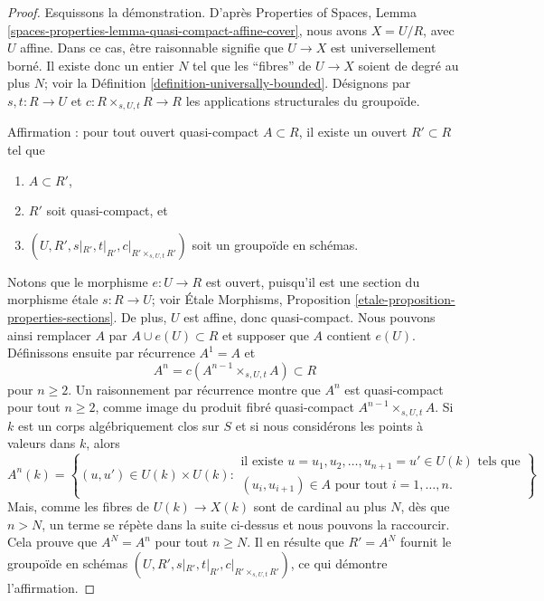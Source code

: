 \begin{proof}
Esquissons la démonstration. D'après
Properties of Spaces, Lemma
\ref{spaces-properties-lemma-quasi-compact-affine-cover},
nous avons $X = U/R$, avec $U$ affine.
Dans ce cas, être raisonnable signifie que $U \to X$ est
universellement borné. Il existe donc un entier $N$ tel que les ``fibres'' de
$U \to X$ soient de degré au plus $N$; voir la
Définition \ref{definition-universally-bounded}.
Désignons par $s, t : R \to U$ et $c : R \times_{s, U, t} R \to R$ les
applications structurales du groupoïde.

\medskip\noindent
Affirmation : pour tout ouvert quasi-compact $A \subset R$, il existe un ouvert
$R' \subset R$ tel que
\begin{enumerate}
\item $A \subset R'$,
\item $R'$ soit quasi-compact, et
\item $(U, R', s|_{R'}, t|_{R'}, c|_{R' \times_{s, U, t} R'})$ soit
un groupoïde en schémas.
\end{enumerate}
Notons que le morphisme $e : U \to R$ est ouvert, puisqu'il est une section du
morphisme étale $s : R \to U$; voir
\'Etale Morphisms, Proposition \ref{etale-proposition-properties-sections}.
De plus, $U$ est affine, donc quasi-compact. Nous pouvons ainsi remplacer $A$
par $A \cup e(U) \subset R$ et supposer que $A$ contient $e(U)$. Définissons
ensuite par récurrence $A^1 = A$ et
$$
A^n = c(A^{n - 1} \times_{s, U, t} A) \subset R
$$
pour $n \geq 2$. Un raisonnement par récurrence montre que $A^n$ est
quasi-compact pour tout $n \geq 2$, comme image du produit fibré quasi-compact
$A^{n - 1} \times_{s, U, t} A$. Si $k$ est un corps algébriquement clos sur
$S$ et si nous considérons les points à valeurs dans $k$, alors
$$
A^n(k) = \left\{(u, u') \in U(k) \times U(k)
:
\begin{matrix}
\text{il existe } u = u_1, u_2, \ldots, u_{n + 1} = u' \in U(k)
\text{ tels que} \\
(u_i , u_{i + 1}) \in A \text{ pour tout }i = 1, \ldots, n.
\end{matrix}
\right\}
$$
Mais, comme les fibres de $U(k) \to X(k)$ sont de cardinal au plus $N$, dès
que $n > N$, un terme se répète dans la suite ci-dessus et nous pouvons la
raccourcir. Cela prouve que $A^N = A^n$ pour tout $n \geq N$.
Il en résulte que $R' = A^N$ fournit le groupoïde en schémas
$(U, R', s|_{R'}, t|_{R'}, c|_{R' \times_{s, U, t} R'})$, ce qui démontre
l'affirmation.


\end{proof}
